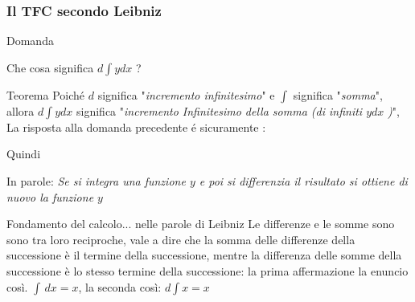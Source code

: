 \begin{frame}
    \frametitle{Il TFC secondo Leibniz}
    \begin{alertblock}{Domanda}
    \begin{center}
        \fontsize{15}{17.2}\selectfont
        Che cosa significa $d$$\int$$ydx$ ?
    \end{center}
    \end{alertblock}
    \begin{block}{Teorema}
        Poiché $d$ significa "\textit{incremento infinitesimo}" e $\int$
        significa "\textit{somma}", allora $d$$\int$$ydx$ significa
        "\textit{incremento Infinitesimo della somma (di infiniti $ydx$} \textit{)}",
        La risposta alla domanda precedente é sicuramente :
        \begin{center}
        \scalebox{2}{%
                    $d$$\int$$ydx = ydx$%
                    }
        \end{center}
        Quindi
        \begin{center}
        \end{center}
        In parole: \textit{Se si integra una funzione $y$ e poi si 
        differenzia il risultato si ottiene di nuovo la funzione $y$
        }
    \end{block}

    \begin{block}{Fondamento del calcolo... nelle parole di Leibniz}
        Le differenze e le somme sono sono tra loro reciproche, vale a dire che la somma delle differenze
        della successione è il termine della successione, mentre la differenza delle somme della successione
        è lo stesso termine della successione: la prima affermazione la enuncio così. $\int \,dx = x$,
        la seconda così: $d \int x = x$ 
    \end{block}
\end{frame}